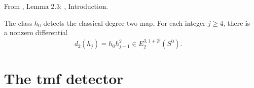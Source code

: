 \begin{theorem}
\label{sem:Literature:one-line-differentials}
From \cite{Adams58}, Lemma 2.3; \cite{LWX126}, Introduction.\par

The class $h_0$ detects the classical degree-two map. For each integer $j\ge4$, there is a nonzero differential
\[d_2(h_j)=h_0h_{j-1}^2\in E_2^{3,1+2^j}(S^0).\]
\end{theorem}

\section{The tmf detector}


